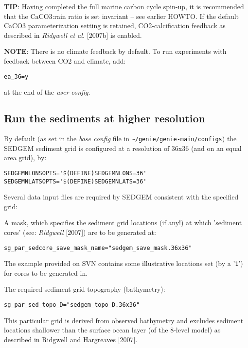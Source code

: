 \documentclass[10pt,twoside]{article}
\begin{document}
\noindent \textbf{TIP}: Having completed the full marine carbon cycle spin-up, it is recommended that the CaCO3:rain ratio is set invariant -- see earlier HOWTO. If the default CaCO3 parameterization setting is retained, CO2-calcification feedback as described in \textit{Ridgwell et al.} [2007b] is enabled.

\noindent \textbf{NOTE}: There is no climate feedback by default. To run experiments with feedback between CO2 and climate, add:\vspace{-11pt}\begin{verbatim}ea_36=y\end{verbatim}\vspace{-11pt}
at the end of the \textit{user config}.



\subsection{Run the sediments at higher resolution}\label{Run the sediments at higher resolution}

By default (as set in the \textit{base config} file in \texttt{\~{}/genie/genie-main/configs}) the SEDGEM sediment grid is configured at a resolution of 36x36 (and on an equal area grid), by:
\vspace{-5.5pt}\begin{verbatim}
SEDGEMNLONSOPTS='$(DEFINE)SEDGEMNLONS=36'
SEDGEMNLATSOPTS='$(DEFINE)SEDGEMNLATS=36'
\end{verbatim}\vspace{-5.5pt}
Several data input files are required by SEDGEM consistent with the specified grid:

\begin{compactitem}
	
	\item A mask, which specifies the sediment grid locations (if any!) at which 'sediment cores' (see: \textit{Ridgwell} [2007]) are to be generated at:
	\vspace{-5.5pt}\begin{verbatim}sg_par_sedcore_save_mask_name="sedgem_save_mask.36x36"\end{verbatim}\vspace{-5.5pt}
	The example provided on SVN contains some illustrative locations set (by a '\texttt{1}') for cores to be generated in.
	
	\item The required sediment grid topography (bathymetry):
	\vspace{-5.5pt}\begin{verbatim}sg_par_sed_topo_D="sedgem_topo_D.36x36"\end{verbatim}\vspace{-5.5pt}
	This particular grid is derived from observed bathymetry and excludes sediment locations shallower than the surface ocean layer (of the 8-level model) as described in Ridgwell and Hargreaves [2007].
	
\end{compactitem}
\end{document}
